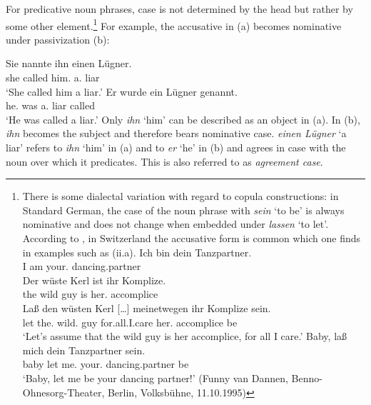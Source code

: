 For predicative\label{page-Kasuskongruenz} noun phrases, case is not determined by the head but rather by some other element.\footnote{
	There is some dialectal variation with regard to copula constructions: in Standard German, the case of the noun phrase with \emph{sein} `to be'
	is always nominative and does not change when embedded under \emph{lassen} `to let'. According to \citet*[{\S}\,1259]{Duden95-Authors}, in Switzerland the
	accusative form is common which one finds in examples such as (ii.a).
	\eal
\ex 
\gll Ich bin dein Tanzpartner.\\
     I am your.\nom{} dancing.partner\\
\ex 
\gll Der wüste Kerl ist ihr Komplize.\\
     the wild  guy  is  her.\nom{} accomplice\\
\ex 
\gll Laß den wüsten Kerl [\ldots] meinetwegen ihr Komplize sein.\\
     let the.\acc{} wild.\acc{} guy {} for.all.I.care her.\nom{} accomplice be\\
\glt `Let's assume that the wild guy is her accomplice, for all I care.'  \citep*[{\S}\,6925]{Duden66-Authors}
\ex 
\gll Baby, laß mich dein Tanzpartner sein.\\
     baby let me.\acc{} your.\nom{} dancing.partner be\\
\glt `Baby, let me be your dancing partner!'  (Funny van Dannen, Benno-Ohnesorg-Theater, Berlin, Volksbühne, 11.10.1995)
\zl

        \eal
        \zllast
}
For example, the accusative in (a) becomes nominative under passivization (b):

\eal
\ex 
\gll Sie nannte ihn einen Lügner.\\
	 she called him.\acc{} a.\acc{} liar\\
\glt `She called him a liar.'
\ex 
\gll Er wurde ein Lügner genannt.\\
	 he.\nom{} was a.\nom{} liar called\\
\glt `He was called a liar.'
\zl
Only \emph{ihn} `him' can be described as an object in (a). In (b), \emph{ihn} becomes the subject and therefore 
bears nominative case. \emph{einen Lügner} `a liar' refers to \emph{ihn} `him' in (a) and to \emph{er}
`he' in (b) and agrees in case with the noun over which it predicates.
This is also referred to as \emph{agreement case}.

